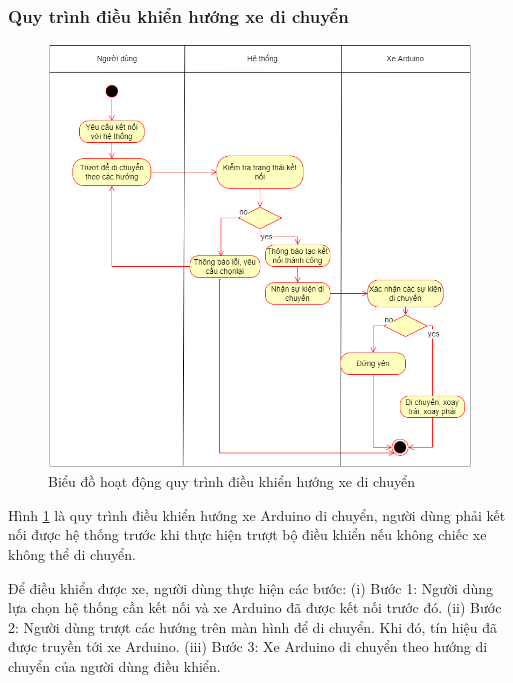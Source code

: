 \documentclass[../DoAn.tex]{subfiles}
\begin{document}
\subsubsection{Quy trình điều khiển hướng xe di chuyển}
\label{subsection:2.2.3.1}
\begin{figure}[H]
    \includegraphics[scale = 0.6]{Hinhve/activity_dieu_khien_xe.png}
    \centering
    \caption{Biểu đồ hoạt động quy trình điều khiển hướng xe di chuyển}
    \label{fig:2.2.3.1}
\end{figure}
Hình \ref{fig:2.2.3.1} là quy trình điều khiển hướng xe Arduino di chuyển, người dùng phải kết nối được hệ thống trước khi thực hiện trượt bộ điều khiển nếu không chiếc xe không thể di chuyển.

Để điều khiển được xe, người dùng thực hiện các bước: (i) Bước 1: Người dùng lựa chọn hệ thống cần kết nối và xe Arduino đã được kết nối trước đó. (ii) Bước 2: Người dùng trượt các hướng trên màn hình để di chuyển. Khi đó, tín hiệu đã được truyền tới xe Arduino. (iii) Bước 3: Xe Arduino di chuyển theo hướng di chuyển của người dùng điều khiển.
\end{document}
